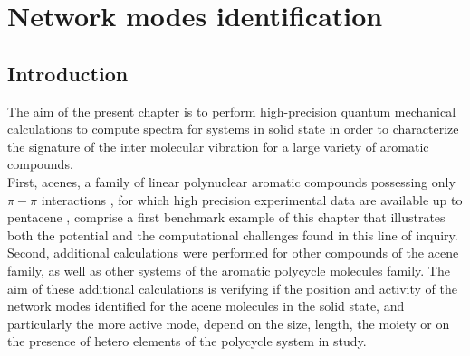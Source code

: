 \chapter[Phonon calculation]{Network modes identification}
\minitoc
\restoregeometry

\newpage


\section*{Introduction}

The aim of the present chapter is to perform high-precision quantum mechanical calculations to compute spectra for systems in solid state in order to characterize the signature of the inter molecular vibration for a large variety of aromatic compounds.\\

First, acenes, a family of linear polynuclear aromatic compounds possessing only $\pi-\pi$ interactions \cite{campbell1962crystal,mattheus2001polymorphism,brock1982temperature,facelli1993determination,brock1990temperature}, for which high precision experimental data are available up to pentacene \cite{michaelian2012far}, comprise a first benchmark example of this chapter that illustrates both the potential and the computational challenges found in this line of inquiry.\\

Second, additional calculations were performed for other compounds of the acene family, as well as other systems of the aromatic polycycle molecules family. The aim of these additional calculations is verifying if the position and activity of the network modes identified for the acene molecules in the solid state, and particularly the more active mode, depend on the size, length, the moiety or on the presence of hetero elements of the polycycle system in study.\\



